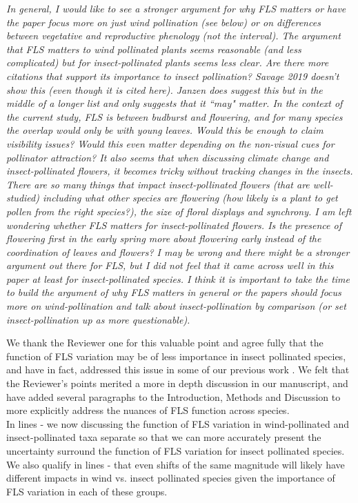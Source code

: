 \documentclass[11pt]{article}
\begin{document}
\emph{In general, I would like to see a stronger argument for why FLS matters or have the paper focus more on just wind pollination (see below) or on differences between vegetative and reproductive phenology (not the interval). The argument that FLS matters to wind pollinated plants seems reasonable (and less complicated) but for insect-pollinated plants seems less clear. Are there more citations that support its importance to insect pollination? Savage 2019 doesn’t show this (even though it is cited here). Janzen does suggest this but in the middle of a longer list and only suggests that it ``may" matter. In the context of the current study, FLS is between budburst and flowering, and for many species the overlap would only be with young leaves. Would this be enough to claim visibility issues? Would this even matter depending on the non-visual cues for pollinator attraction? It also seems that when discussing climate change and insect-pollinated flowers, it becomes tricky without tracking changes in the insects. There are so many things that impact insect-pollinated flowers (that are well-studied) including what other species are flowering (how likely is a plant to get pollen from the right species?), the size of floral displays and synchrony. I am left wondering whether FLS matters for insect-pollinated flowers. Is the presence of flowering first in the early spring more about flowering early instead of the coordination of leaves and flowers?  I may be wrong and there might be a stronger argument out there for FLS, but I did not feel that it came across well in this paper at least for insect-pollinated species. I think it is important to take the time to build the argument of why FLS matters in general or the papers should focus more on wind-pollination and talk about insect-pollination by comparison (or set insect-pollination up as more questionable).}

\noindent We thank the Reviewer one for this valuable point and agree fully that the function of FLS variation may be of less importance in insect pollinated species, and have in fact, addressed this issue in some of our previous work \citep{Buonaiuto2020}. We felt that the Reviewer's points merited a more in depth discussion in our manuscript, and have added several paragraphs to the Introduction, Methods and Discussion to more explicitly address the nuances of FLS function across species.\\

In lines - we now discussing the function of FLS variation in wind-pollinated and insect-pollinated taxa separate so that we can more accurately present the uncertainty surround the function of FLS variation for insect pollinated species. We also qualify in lines - that even shifts of the same magnitude will likely have different impacts in wind vs. insect pollinated species given the importance of FLS variation in each of these groups.\\
\end{document}
